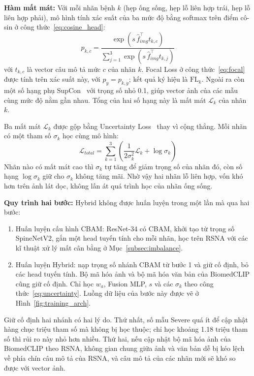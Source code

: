 \textbf{Hàm mất mát:} Với mỗi nhãn bệnh $k$ (hẹp ống sống, hẹp lỗ liên hợp trái, hẹp lỗ liên hợp phải), mô hình tính xác suất của ba mức độ bằng softmax trên điểm cô-sin ở công thức~\eqref{eq:cosine_head}:
\begin{equation}
    p_{k,c} = \frac{\exp(s\,\hat{f}_{img}^{\top} t_{k,c})}{\sum_{j=1}^{3}\exp(s\,\hat{f}_{img}^{\top} t_{k,j})}
    \label{eq:cosine_prob}
\end{equation}
với $t_{k,c}$ là vector câu mô tả mức $c$ của nhãn $k$. Focal Loss ở công thức~\eqref{eq:focal} được tính trên xác suất này, với $p_y = p_{k,y}$; kết quả ký hiệu là $\text{FL}_k$. Ngoài ra còn một số hạng phụ SupCon~\cite{khosla2020supcon} với trọng số nhỏ 0.1, giúp vector ảnh của các mẫu cùng mức độ nằm gần nhau. Tổng của hai số hạng này là mất mát $\mathcal{L}_k$ của nhãn $k$.

Ba mất mát $\mathcal{L}_k$ được gộp bằng Uncertainty Loss~\cite{kendall2018multitask} thay vì cộng thẳng. Mỗi nhãn có một tham số $\sigma_k$ học cùng mô hình:
\begin{equation}
    \mathcal{L}_{total} = \sum_{k=1}^{3} \left( \frac{1}{2 \sigma_k^2} \mathcal{L}_k + \log \sigma_k \right)
    \label{eq:uncertainty}
\end{equation}
Nhãn nào có mất mát cao thì $\sigma_k$ tự tăng để giảm trọng số của nhãn đó, còn số hạng $\log \sigma_k$ giữ cho $\sigma_k$ không tăng mãi. Nhờ vậy hai nhãn lỗ liên hợp, vốn khó hơn trên ảnh lát dọc, không lấn át quá trình học của nhãn ống sống.

\textbf{Quy trình hai bước:} Hybrid không được huấn luyện trong một lần mà qua hai bước:
\begin{enumerate}
    \item Huấn luyện cấu hình CBAM: ResNet-34 có CBAM, khởi tạo từ trọng số SpineNetV2, gắn một head tuyến tính cho mỗi nhãn, học trên RSNA với các kĩ thuật xử lý mất cân bằng ở Mục~\ref{subsec:imbalance}.
    \item Huấn luyện Hybrid: nạp trọng số nhánh CBAM từ bước 1 và giữ cố định, bỏ các head tuyến tính. Bộ mã hóa ảnh và bộ mã hóa văn bản của BiomedCLIP cũng giữ cố định. Chỉ học $w_a$, Fusion MLP, $s$ và các $\sigma_k$ theo công thức~\eqref{eq:uncertainty}. Luồng dữ liệu của bước này được vẽ ở Hình~\ref{fig:training_arch}.
\end{enumerate}

Giữ cố định hai nhánh có hai lý do. Thứ nhất, số mẫu Severe quá ít để cập nhật hàng chục triệu tham số mà không bị học thuộc; chỉ học khoảng 1.18 triệu tham số thì rủi ro này nhỏ hơn nhiều. Thứ hai, nếu cập nhật bộ mã hóa ảnh của BiomedCLIP theo RSNA, không gian chung giữa ảnh và văn bản dễ bị kéo lệch về phía chín câu mô tả của RSNA, và câu mô tả của các nhãn mới sẽ khó so được với vector ảnh.

